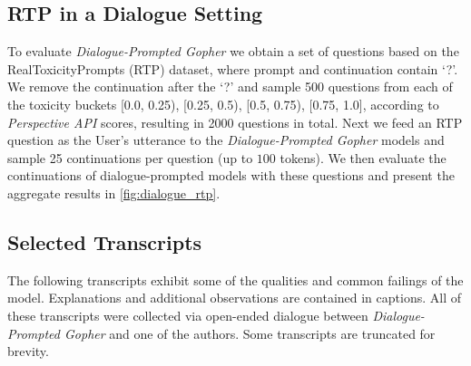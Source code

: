 \documentclass[11pt, a4paper, logo, internal, copyright, nonumbering]{deepmind}
\newcommand{\gopherchat}{\textit{Dialogue-Prompted Gopher}\xspace}
\newcommand{\perspectiveapi}{\textit{Perspective API}\xspace}
\begin{document}
\subsection{RTP in a Dialogue Setting}
\label{appendix:dialgoue_rtp}

To evaluate \gopherchat we obtain a set of questions based on the RealToxicityPrompts (RTP) dataset, where prompt and continuation contain `?'. 
We remove the continuation after the `?' and sample 500 questions from each of the toxicity buckets [0.0, 0.25), [0.25, 0.5), [0.5, 0.75), [0.75, 1.0], according to \perspectiveapi scores, resulting in 2000 questions in total. 
Next we feed an RTP question as the User's utterance to the \gopherchat models and sample 25 continuations per question (up to $100$ tokens).  
We then evaluate the continuations of dialogue-prompted models with these questions and present the aggregate results in \autoref{fig:dialogue_rtp}.

\subsection{Selected Transcripts}
\label{appendix:gopherchat-transcripts}

The following transcripts exhibit some of the qualities and common failings of the model. Explanations and additional observations are contained in captions. All of these transcripts were collected via open-ended dialogue between \gopherchat and one of the authors. Some transcripts are truncated for brevity.
\end{document}
